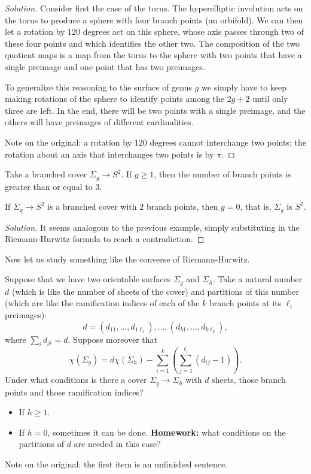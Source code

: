 \begin{proof}[Solution]
Consider first the case of the torus.
The hyperelliptic involution acts on the
torus to produce a sphere with four
branch points (an orbifold). We can then
let a rotation by $120$ degrees act on
this sphere, whose axis passes through
two of these four points and which
identifies the other two. The
composition of the two quotient maps is
a map from the torus to the sphere with
two points that have a single preimage
and one point that has two preimages.

To generalize this reasoning to the
surface of genus $g$ we simply have to
keep making rotations of the sphere to
identify points among the $2g+2$ until
only three are left. In the end, there
will be two points with a single
preimage, and the others will have
preimages of different cardinalities.

Note on the original: a rotation by
$120$ degrees cannot interchange two
points; the rotation about an axis that
interchanges two points is by $\pi$.
\end{proof}

\begin{example}
\label{example-at-least-three}
Take a branched cover $\Sigma_g\to S^2$.
If $g\geq1$, then the number of branch
points is greater than or equal to $3$.
\end{example}

\begin{exercise}[Homework]
\label{exercise-two-branch-points}
If $\Sigma_g\to S^2$ is a branched cover
with $2$ branch points, then $g=0$, that
is, $\Sigma_g$ is $S^2$.
\end{exercise}

\begin{proof}[Solution]
It seems analogous to the previous
example, simply substituting in the
Riemann-Hurwitz formula to reach a
contradiction.
\end{proof}

Now let us study something like the
converse of Riemann-Hurwitz.

Suppose that we have two orientable
surfaces $\Sigma_g$ and $\Sigma_h$. Take
a natural number $d$ (which is like the
number of sheets of the cover) and
partitions of this number (which are
like the ramification indices of each of
the $k$ branch points at its $\ell_i$
preimages):
$$
d=(d_{11},\ldots,d_{1\ell_1}),\ldots,
(d_{k1},\ldots,d_{k\ell_k}),
$$
where $\sum_id_{ji}=d$. Suppose moreover
that
$$
\chi(\Sigma_g)=d\chi(\Sigma_h)
-\sum_{i=1}^k\left(
\sum_{j=1}^{\ell_i}(d_{ij}-1)\right).
$$
Under what conditions is there a cover
$\Sigma_g\to\Sigma_h$ with $d$ sheets,
those branch points and those
ramification indices?
\begin{itemize}
\item If $h\geq1$.
\item If $h=0$, sometimes it can be
done. {\bf Homework:} what conditions on
the partitions of $d$ are needed in this
case?
\end{itemize}
Note on the original: the first item is
an unfinished sentence.

